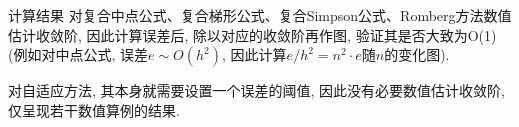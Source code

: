 \documentclass{article}
\begin{document}
\begin{section}{计算结果}
    对复合中点公式、复合梯形公式、复合Simpson公式、Romberg方法数值估计收敛阶, 因此计算误差后, 除以对应的收敛阶再作图, 验证其是否大致为O(1) (例如对中点公式, 误差$e\sim O(h^2)$, 因此计算$e/h^2=n^2\cdot e$随$n$的变化图).

    对自适应方法, 其本身就需要设置一个误差的阈值, 因此没有必要数值估计收敛阶, 仅呈现若干数值算例的结果.

    \begin{figure}[!htbp]
        \centering
\end{figure}
\end{section}
\end{document}
